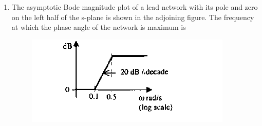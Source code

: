 \documentclass[journal,12pt,onecolumn]{IEEEtran}
\theoremstyle{remark}
\begin{document}
\begin{enumerate}
\item The asymptotic Bode magnitude plot of a lead network with its pole and zero on the left half of the s-plane is shown in the adjoining figure. The frequency at which the phase angle of the network is maximum  is
\begin{figure}[H]
    \centering
    \includegraphics[width = 0.7\columnwidth]{q37}
    \caption*{}
    \label{Q37}
\end{figure}
\hfill{}\begin{enumerate}  \end{enumerate}


\end{enumerate}
\end{document}
